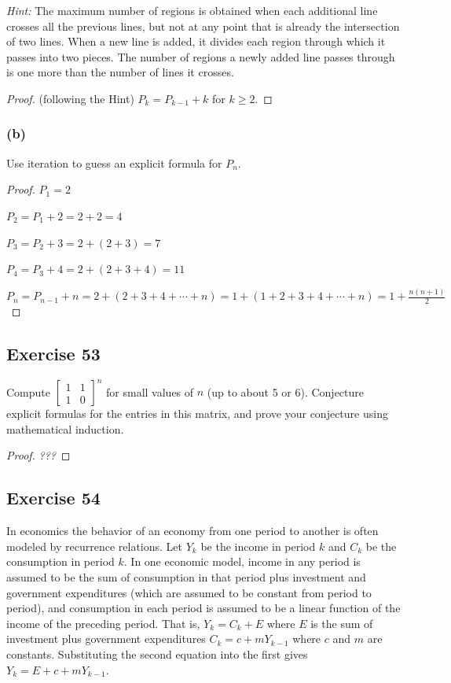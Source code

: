 \documentclass[14pt]{extarticle}
\begin{document}
{\it Hint:} The maximum number of regions is obtained when each additional line crosses all the previous lines, but 
not at any point that is already the intersection of two lines. When a new line is added, it divides each region 
through which it passes into two pieces. The number of regions a newly added line passes through is one more than 
the number of lines it crosses.

\begin{proof}
(following the Hint) \(P_k = P_{k-1} + k\) for \(k \geq 2\).
\end{proof}

\subsubsection{(b)}
Use iteration to guess an explicit formula for $P_n$.

\begin{proof}
\(P_1 = 2\)

\(P_2 = P_1 + 2 = 2 + 2 = 4\)

\(P_3 = P_2 + 3 = 2 + (2 + 3) = 7\)

\(P_4 = P_3 + 4 = 2 + (2 + 3 + 4) = 11\)

\(P_n = P_{n-1} + n = 2 + (2 + 3 + 4 + \cdots + n) = 1 + (1 + 2 + 3 + 4 + \cdots + n) = 1 + \frac{n(n+1)}{2}\)
\end{proof}

\subsection{Exercise 53}
Compute \(
\left[ 
\begin{array}{cc}
1 & 1 \\
1 & 0
\end{array}
\right]^n
\) for small values of $n$ (up to about 5 or 6). Conjecture explicit formulas for the entries in this matrix, and prove 
your conjecture using mathematical induction. 

\begin{proof}
{\it ???}
\end{proof}

\subsection{Exercise 54}
In economics the behavior of an economy from one period to another is often modeled by recurrence relations. Let $Y_k$ 
be the income in period $k$ and $C_k$ be the consumption in period $k$. In one economic model, income in any period is 
assumed to be the sum of consumption in that period plus investment and government expenditures (which are assumed 
to be constant from period to period), and consumption in each period is assumed to be a linear function of the 
income of the preceding period. That is, \(Y_k = C_k + E\) where $E$ is the sum of investment plus government 
expenditures \(C_k = c + m Y_{k-1}\) where $c$ and $m$ are constants. Substituting the second equation into the first 
gives \(Y_k = E + c + m Y_{k-1}\).
\end{document}
